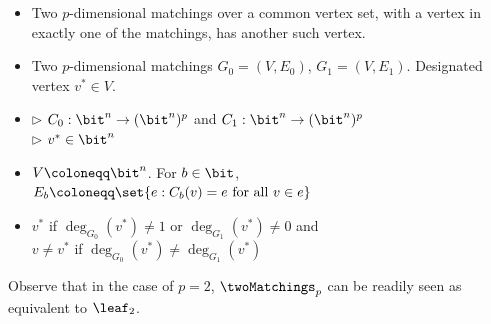 \noindent
\begin{minipage}{\linewidth}
\begin{definition}
	\label{def:two-matchings} \vspace{-5pt}
	\begin{itemize}[leftmargin=2.15cm,itemsep=4pt]
		\item[\slshape Principle:] Two $p$-dimensional matchings over a common vertex set, with a vertex in exactly one of the matchings, has another such vertex.
		\item[\slshape Object:] Two $p$-dimensional matchings $G_0 = (V, E_0)$, $G_1 = (V, E_1)$. Designated vertex $v^* \in V$.
		\item[\slshape Inputs:] $\triangleright$ $C_0:\bit^n \to (\bit^n)^p$ and $C_1:\bit^n \to (\bit^n)^p$\\
	$\triangleright$ $v^* \in \bit^n$
		\item[\slshape Encoding:] $V\coloneqq\bit^n$. For $b \in \bit$, $E_b \coloneqq \set{e : C_b(v) = e \text{ for all } v \in e}$	
		\item[\slshape Solutions:] $v^*$ if $\deg_{G_0}(v^*) \ne 1$ or $\deg_{G_1}(v^*) \ne 0$ and\\
	$v \ne v^*$ if $\deg_{G_0}(v^*) \ne \deg_{G_1}(v^*)$
	\end{itemize}
\end{definition}
\end{minipage}\vspace{5mm}


\noindent Observe that in the case of $p=2$, $\twoMatchings_p$ can be readily seen as equivalent to $\leaf_2$.

